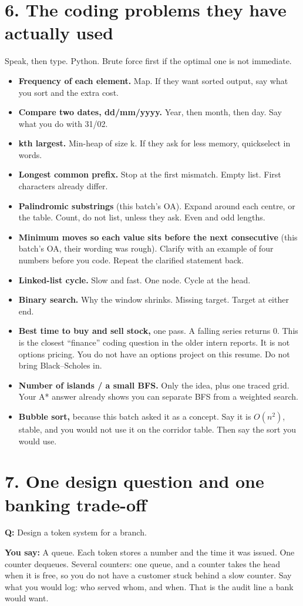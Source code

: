 \documentclass[a4paper,9.5pt]{extarticle}
\newcommand{\Q}[1]{\par\vspace{1.5pt}\noindent\textcolor{hot}{\textbf{Q:} #1}\par}
\newcommand{\Say}[1]{\noindent\textcolor{ok}{\textbf{You say:} #1}\par}
\begin{document}
\section{6. The coding problems they have actually used}
Speak, then type. Python. Brute force first if the optimal one is not immediate.
\begin{itemize}
  \item \textbf{Frequency of each element.} Map. If they want sorted output, say what you sort and the extra cost.
  \item \textbf{Compare two dates, dd/mm/yyyy.} Year, then month, then day. Say what you do with 31/02.
  \item \textbf{kth largest.} Min-heap of size k. If they ask for less memory, quickselect in words.
  \item \textbf{Longest common prefix.} Stop at the first mismatch. Empty list. First characters already differ.
  \item \textbf{Palindromic substrings} (this batch's OA). Expand around each centre, or the table. Count, do not list, unless they ask. Even and odd lengths.
  \item \textbf{Minimum moves so each value sits before the next consecutive} (this batch's OA, their wording was rough). Clarify with an example of four numbers before you code. Repeat the clarified statement back.
  \item \textbf{Linked-list cycle.} Slow and fast. One node. Cycle at the head.
  \item \textbf{Binary search.} Why the window shrinks. Missing target. Target at either end.
  \item \textbf{Best time to buy and sell stock,} one pass. A falling series returns 0. This is the closest ``finance'' coding question in the older intern reports. It is not options pricing. You do not have an options project on this resume. Do not bring Black--Scholes in.
  \item \textbf{Number of islands / a small BFS.} Only the idea, plus one traced grid. Your A* answer already shows you can separate BFS from a weighted search.
  \item \textbf{Bubble sort,} because this batch asked it as a concept. Say it is $O(n^2)$, stable, and you would not use it on the corridor table. Then say the sort you would use.
\end{itemize}

\section{7. One design question and one banking trade-off}
\Q{Design a token system for a branch.}
\Say{A queue. Each token stores a number and the time it was issued. One counter dequeues. Several counters: one queue, and a counter takes the head when it is free, so you do not have a customer stuck behind a slow counter. Say what you would log: who served whom, and when. That is the audit line a bank would want.}
\end{document}
